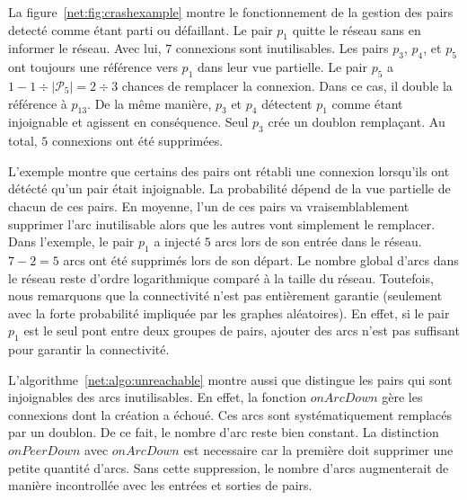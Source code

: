 La figure~\ref{net:fig:crashexample} montre le fonctionnement de la gestion des
pairs detecté comme étant parti ou défaillant. Le pair $p_1$ quitte le réseau
sans en informer le réseau. Avec lui, $7$ connexions sont inutilisables. Les
pairs $p_3$, $p_4$, et $p_5$ ont toujours une référence vers $p_1$ dans leur vue
partielle. Le pair $p_5$ a $1-{1\div{|\mathcal{P}_5|}}={2\div{3}}$ chances de
remplacer la connexion. Dans ce cas, il double la référence à $p_{13}$. De la
même manière, $p_3$ et $p_4$ détectent $p_1$ comme étant injoignable et agissent
en conséquence. Seul $p_3$ crée un doublon remplaçant. Au total, $5$ connexions
ont été supprimées.

L'exemple montre que certains des pairs ont rétabli une connexion lorsqu'ils ont
détécté qu'un pair était injoignable. La probabilité dépend de la vue partielle
de chacun de ces pairs. En moyenne, l'un de ces pairs va vraisemblablement
supprimer l'arc inutilisable alors que les autres vont simplement le
remplacer. Dans l'exemple, le pair $p_1$ a injecté $5$ arcs lors de son entrée
dans le réseau. $7-2 = 5$ arcs ont été supprimés lors de son départ. Le nombre
global d'arcs dans le réseau reste d'ordre logarithmique comparé à la taille du
réseau. Toutefois, nous remarquons que la connectivité n'est pas entièrement
garantie (seulement avec la forte probabilité impliquée par les graphes
aléatoires). En effet, si le pair $p_1$ est le seul pont entre deux groupes de
pairs, ajouter des arcs n'est pas suffisant pour garantir la connectivité.

L'algorithme~\ref{net:algo:unreachable} montre aussi que \SPRAY distingue les
pairs qui sont injoignables des arcs inutilisables. En effet, la fonction
$onArcDown$ gère les connexions dont la création a échoué. Ces arcs sont
systématiquement remplacés par un doublon. De ce fait, le nombre d'arc reste
bien constant. La distinction $onPeerDown$ avec $onArcDown$ est necessaire car
la première doit supprimer une petite quantité d'arcs. Sans cette suppression,
le nombre d'arcs augmenterait de manière incontrollée avec les entrées et
sorties de pairs.
